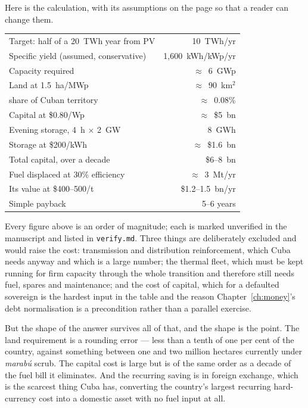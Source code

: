 Here is the calculation, with its assumptions on the page so that a reader can
change them.

\begin{center}
\footnotesize
\begin{tabular}{@{}L{2.35in}r@{}}
\toprule
Target: half of a 20~TWh year from PV & 10~TWh/yr \\
Specific yield (assumed, conservative) & 1{,}600~kWh/kWp/yr \\
\midrule
Capacity required & $\approx$~6~GWp \\
Land at 1.5~ha/MWp & $\approx$~90~km$^2$ \\
\quad share of Cuban territory & $\approx$~0.08\% \\
Capital at \$0.80/Wp & $\approx$~\$5~bn \\
Evening storage, 4~h $\times$ 2~GW & 8~GWh \\
Storage at \$200/kWh & $\approx$~\$1.6~bn \\
\midrule
Total capital, over a decade & \$6--8~bn \\
Fuel displaced at 30\% efficiency & $\approx$~3~Mt/yr \\
Its value at \$400--500/t & \$1.2--1.5~bn/yr \\
\midrule
Simple payback & 5--6 years \\
\bottomrule
\end{tabular}
\end{center}

\noindent Every figure above is an order of magnitude; each is marked unverified
in the manuscript and listed in \texttt{verify.md}. Three things are
deliberately excluded and would
raise the cost: transmission and distribution reinforcement, which Cuba needs
anyway and which is a large number; the thermal fleet, which must be kept
running for firm capacity through the whole transition and therefore still needs
fuel, spares and maintenance; and the cost of capital, which for a defaulted
sovereign is the hardest input in the table and the reason
Chapter~\ref{ch:money}'s debt normalisation is a precondition rather than a
parallel exercise.

But the shape of the answer survives all of that, and the shape is the point.
The land requirement is a rounding error --- less than a tenth of one per cent
of the country, against something between one and two million hectares currently
under \emph{marab\'u} scrub. The capital cost is large but is of the same order
as a decade of the fuel bill it eliminates. And the recurring saving is in
foreign exchange, which is the scarcest thing Cuba has, converting the country's
largest recurring hard-currency cost into a domestic asset with no fuel input at
all.

